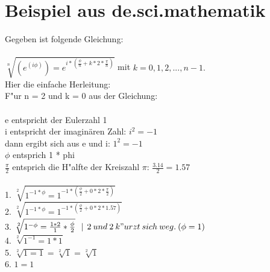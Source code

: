 \section{Beispiel aus de.sci.mathematik}

Gegeben ist folgende Gleichung: \\ \\
$\sqrt[n]{(e^{(i \phi)}) = e^{i * (\frac{\phi}{n} + k * 2 * \frac{\pi}{n})} } $ mit  $ k = 0, 1, 2,..., n-1. $ \\

Hier die einfache Herleitung: \\
F"ur n = 2 und k = 0 aus der Gleichung: \\
\\
e entspricht der Eulerzahl 1 \\
i entspricht der imaginären Zahl: \: $ i^2 = -1 $ \\
dann ergibt sich aus e und i: \: $ 1^2 = -1 $ \\
$ \phi $ entsprich 1 * phi \\
$ \frac{\pi}{2} $ entsprich die H"alfte der Kreiszahl $\pi $: $ \frac{3.14}{2} = 1.57 $ \\
\\
1. $ \sqrt[2]{1^{-1 * \phi} = 1^{-1 * (\frac{\phi}{2} + 0 * 2 * \frac{\pi}{2})}} $ \\
2. $ \sqrt[2]{1^{-1 * \phi} = 1^{-1 * (\frac{\phi}{2} + 0 * 2 * 1.57)}} $ \\
3. $ \sqrt[2]{1^{-\phi} = \frac{1 * 2}{1} * \frac{\phi}{2}}  \: \: \: | \: \: 2 \: und \: 2 \: k"urzt \: sich \: weg. \: (\phi = 1)$\\
4. $ \sqrt[2]{1^{-1} = 1 * 1} $ \\
5. $ \sqrt[2]{1 = 1} = \sqrt[2]{1} = \sqrt[2]{1} $ \\
6. $ 1 = 1 $ \\
\\

